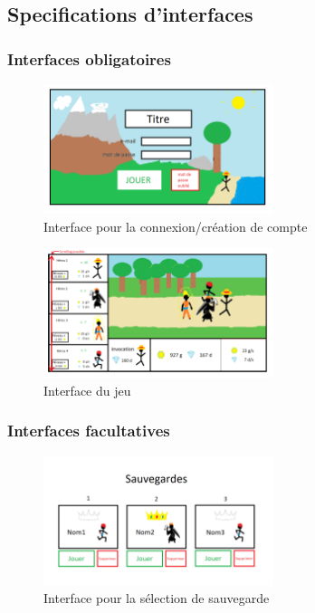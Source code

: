 \subsection{Specifications d'interfaces}

    \subsubsection{Interfaces obligatoires}

        \begin{figure}[ht!]
            \centering
                \includegraphics[width=0.6\textwidth]{images/EcranTitre.png}
            \caption{Interface pour la connexion/création de compte}
        \end{figure}


        \begin{figure}[ht!]
            \centering
                \includegraphics[width=0.6\textwidth]{images/TWJeuHUDSansOptions.png}
            \caption{Interface du jeu}
        \end{figure}

        \newpage

    \subsubsection{Interfaces facultatives}

        \begin{figure}[ht!]
            \centering
                \includegraphics[width=0.6\textwidth]{images/ChoixSauvegarde.png}
            \caption{Interface pour la sélection de sauvegarde}
        \end{figure}

